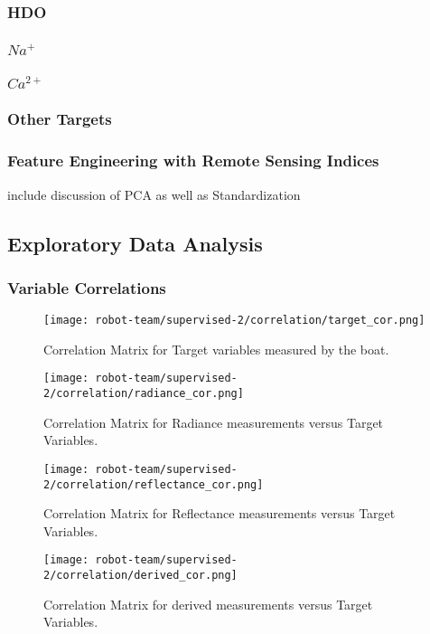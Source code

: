 \subsubsection{HDO}
\subsubsection{$Na^{+}$}
\subsubsection{$Ca^{2+}$}
\subsubsection{Other Targets}

\subsubsection{Feature Engineering with Remote Sensing Indices}
include discussion of PCA as well as Standardization


\subsection{Exploratory Data Analysis}
\subsubsection{Variable Correlations}

\begin{figure}[h]
\texttt{[image: robot-team/supervised-2/correlation/target\_cor.png]}
\caption{Correlation Matrix for Target variables measured by the boat.\label{target_cor}}
\end{figure}

\begin{figure}[h]
\texttt{[image: robot-team/supervised-2/correlation/radiance\_cor.png]}
\caption{Correlation Matrix for Radiance measurements versus Target Variables.\label{rad_cor}}
\end{figure}

\begin{figure}[h]
\texttt{[image: robot-team/supervised-2/correlation/reflectance\_cor.png]}
\caption{Correlation Matrix for Reflectance measurements versus Target Variables.\label{ref_cor}}
\end{figure}

\begin{figure}[h]
\texttt{[image: robot-team/supervised-2/correlation/derived\_cor.png]}
\caption{Correlation Matrix for derived measurements versus Target Variables.\label{derived_cor}}
\end{figure}




